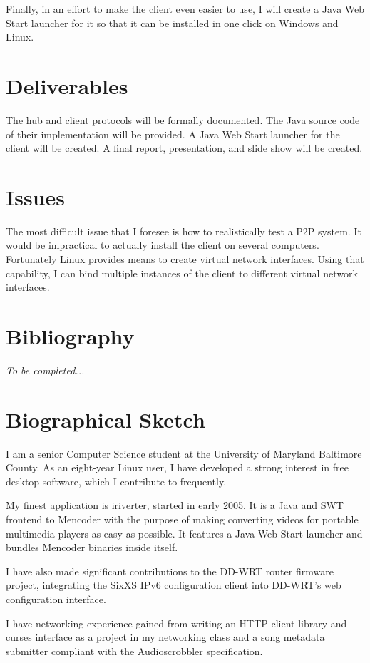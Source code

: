 \documentclass{article}
\begin{document}
Finally, in an effort to make the client even easier to use, I will create a Java Web Start launcher for it so that it can be installed in one click on Windows and Linux.

\section{Deliverables}
The hub and client protocols will be formally documented.  The Java source code of their implementation will be provided.  A Java Web Start launcher for the client will be created.  A final report, presentation, and slide show will be created.

\section{Issues}
The most difficult issue that I foresee is how to realistically test a P2P system.  It would be impractical to actually install the client on several computers.  Fortunately Linux provides means to create virtual network interfaces.  Using that capability, I can bind multiple instances of the client to different virtual network interfaces.

\section{Bibliography}
\emph{To be completed...}

\section{Biographical Sketch}
I am a senior Computer Science student at the University of Maryland Baltimore County.  As an eight-year Linux user, I have developed a strong interest in free desktop software, which I contribute to frequently.

My finest application is iriverter, started in early 2005.  It is a Java and SWT frontend to Mencoder with the purpose of making converting videos for portable multimedia players as easy as possible.  It features a Java Web Start launcher and bundles Mencoder binaries inside itself.

I have also made significant contributions to the DD-WRT router firmware project, integrating the SixXS IPv6 configuration client into DD-WRT's web configuration interface.

I have networking experience gained from writing an HTTP client library and curses interface as a project in my networking class and a song metadata submitter compliant with the Audioscrobbler specification.
\end{document}
